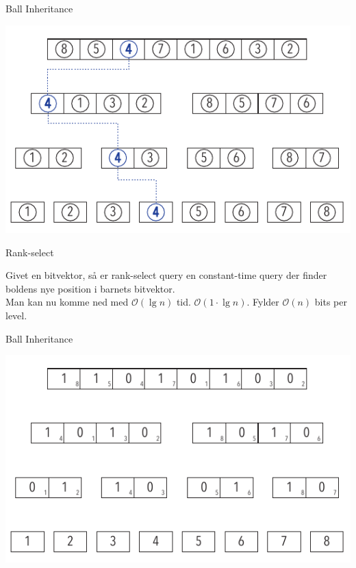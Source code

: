 \documentclass[pdf]{beamer}
\begin{document}
\begin{frame}{Ball Inheritance}
  \begin{center}
    \includegraphics[scale=1.0]{pictures/bolde_4.pdf}
  \end{center}
\end{frame}


\begin{frame}{Rank-select}

  Givet en bitvektor, så er rank-select query en constant-time query der finder boldens nye position i barnets bitvektor. \\

  Man kan nu komme ned med $\mathcal{O}(\lg n)$ tid. $\mathcal{O}(1\cdot\lg n)$. Fylder $\mathcal{O}(n)$ bits per level.
\end{frame}


\begin{frame}{Ball Inheritance}
  \begin{center}
    \includegraphics[scale=1.0]{pictures/uden_bolde_med_tal.pdf}
  \end{center}
\end{frame}
\end{document}
